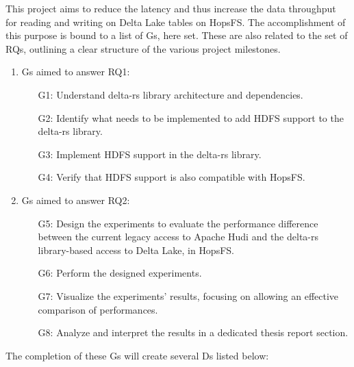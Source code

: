 This project aims to reduce the latency and thus increase the data throughput for reading and writing on Delta Lake tables on \gls{HopsFS}. The accomplishment of this purpose is bound to a list of \glspl{G}, here set. These are also related to the set of \glspl{RQ}, outlining a clear structure of the various project milestones.

\begin{enumerate}
    \item \glspl{G} aimed to answer RQ1: 
        \begin{enumerate}
            \item[G1:] Understand delta-rs library architecture and dependencies.
            \item[G2:] Identify what needs to be implemented to add \gls{HDFS} support to the delta-rs library.  
            \item[G3:] Implement \gls{HDFS} support in the delta-rs library.
            \item[G4:] Verify that \gls{HDFS} support is also compatible with \gls{HopsFS}.
        \end{enumerate}
    \item \glspl{G} aimed to answer RQ2:
        \begin{enumerate}
            \item[G5:] Design the experiments to evaluate the performance difference between the current legacy access to Apache Hudi and the delta-rs library-based access to Delta Lake, in \gls{HopsFS}. 
            \item[G6:] Perform the designed experiments.
            \item[G7:] Visualize the experiments' results, focusing on allowing an effective comparison of performances.
            \item[G8:] Analyze and interpret the results in a dedicated thesis report section.
        \end{enumerate}
\end{enumerate}
The completion of these \glspl{G} will create several \glspl{D} listed below:
